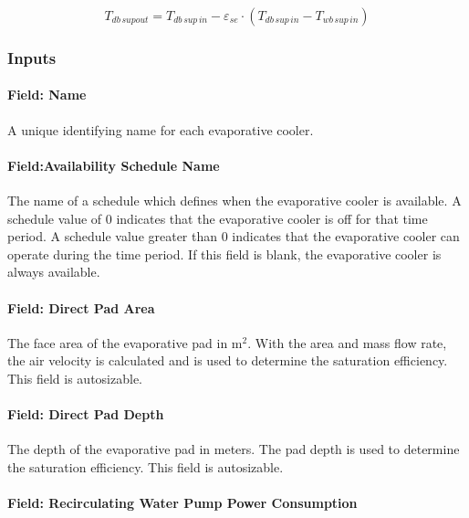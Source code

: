 \begin{equation}
{T_{db\,supout}} = {T_{db\,sup\,in}} - {\varepsilon_{se}}\cdot \left( {{T_{db\,sup\,in}} - {T_{wb\,sup\,in}}} \right)
\end{equation}

\subsubsection{Inputs}\label{inputs-016}

\paragraph{Field: Name}\label{field-name-015}

A unique identifying name for each evaporative cooler.

\paragraph{Field:Availability Schedule Name}\label{fieldavailability-schedule-name}

The name of a schedule which defines when the evaporative cooler is available. A schedule value of 0 indicates that the evaporative cooler is off for that time period. A schedule value greater than 0 indicates that the evaporative cooler can operate during the time period. If this field is blank, the evaporative cooler is always available.

\paragraph{Field: Direct Pad Area}\label{field-direct-pad-area}

The face area of the evaporative pad in m\(^{2}\). With the area and mass flow rate, the air velocity is calculated and is used to determine the saturation efficiency. This field is autosizable.

\paragraph{Field: Direct Pad Depth}\label{field-direct-pad-depth}

The depth of the evaporative pad in meters. The pad depth is used to determine the saturation efficiency. This field is autosizable.

\paragraph{Field: Recirculating Water Pump Power Consumption}\label{field-recirculating-water-pump-power-consumption}

